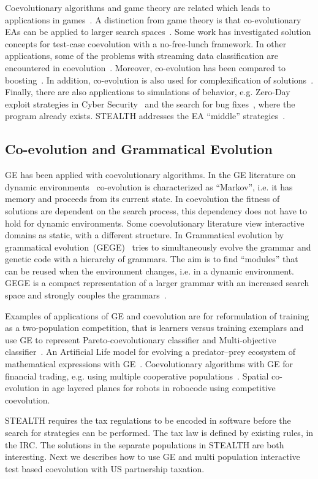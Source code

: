 Coevolutionary algorithms and game theory are related which leads to
applications in games~\citep{popovici2012coevolutionary}. A
distinction from game theory is that co-evolutionary EAs can be
applied to larger search spaces~\citep{rush2015coevolutionary}.  Some
work has investigated solution concepts for test-case coevolution with
a no-free-lunch framework\citep{tauritz2008no}. In other applications,
some of the problems with streaming data classification are
encountered in coevolution~\citep{heywood2015evolutionary}. Moreover,
co-evolution has been compared to boosting~\citep{ibabagging}. In
addition, co-evolution is also used for complexification of
solutions~\citep{stanley2004competitive}. Finally, there are also
applications to simulations of behavior, e.g. Zero-Day exploit
strategies in Cyber Security~\citep{winterrose2014strategic} and the
search for bug fixes~\citep{le2013moving}, where the program already
exists. STEALTH addresses the EA ``middle''
strategies~\citep{rush2015coevolutionary}.

\subsection{Co-evolution and Grammatical Evolution}
\label{sec:co-evol-gramm}

GE has been applied with coevolutionary algorithms. In the GE
literature on dynamic environments~\citep{dempsey2009foundations}
co-evolution is characterized as ``Markov'', i.e. it has memory and
proceeds from its current state. In coevolution the fitness of
solutions are dependent on the search process, this dependency does
not have to hold for dynamic environments. Some coevolutionary
literature view interactive domains as static, with a different
structure. In Grammatical evolution by grammatical
evolution~(GEGE)~\citep{dempsey2009foundations} tries to
simultaneously evolve the grammar and genetic code with a hierarchy of
grammars. The aim is to find ``modules'' that can be reused when the
environment changes, i.e. in a dynamic environment. GEGE is a compact
representation of a larger grammar with an increased search space and
strongly couples the grammars~\citep{azad2006examination}.

Examples of applications of GE and coevolution are for reformulation
of training as a two-population competition, that is learners versus
training exemplars and use GE to represent Pareto-coevolutionary
classifier and Multi-objective classifier~\citep{mcintyre2007multi,
  mcintyre2008cooperative}.  An Artificial Life model for evolving a
predator--prey ecosystem of mathematical expressions with
GE~\citep{alfonseca2015evolving}. Coevolutionary algorithms with GE
for financial trading, e.g. using multiple cooperative
populations~\citep{adamu2011coevolutionary,
  gabrielsson2014co}. Spatial co-evolution in age layered planes
\citep{harper2014evolving} for robots in robocode using competitive
coevolution.

STEALTH requires the tax regulations to be encoded in software before
the search for strategies can be performed. The tax law is defined by
existing rules, in the IRC. The solutions in the separate populations
in STEALTH are both interesting. Next we describes how to use GE and
multi population interactive test based coevolution with US
partnership taxation.
